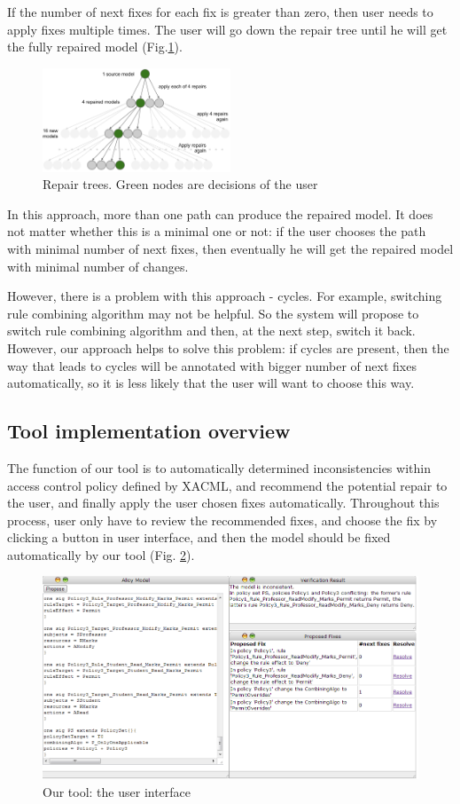 \documentclass{acm_proc_article-sp}
\begin{document}
If the number of next fixes for each fix is greater than zero, then user needs to apply fixes multiple times. The user will go down the repair tree until he will get the fully repaired model (Fig.\ref{fig:tree}).

\begin{figure}[h]
\includegraphics[width=0.5\textwidth]{tree.png}
\caption{Repair trees. Green nodes are decisions of the user}    
  \label{fig:tree}
\end{figure}

In this approach, more than one path can produce the repaired model. It does not matter whether this is a minimal one or not: if the user chooses the path with minimal number of next fixes, then eventually he will get the repaired model with minimal number of changes.

However, there is a problem with this approach - cycles. For example, switching rule combining algorithm may not be helpful. So the system will propose to switch rule combining algorithm and then, at the next step, switch it back. However, our approach helps to solve this problem: if cycles are present, then the way that leads to cycles will be annotated with bigger number of next fixes automatically, so it is less likely that the user will want to choose this way.

\subsection{Tool implementation overview}
The function of our tool is to automatically determined inconsistencies within access control policy defined by XACML, and recommend the potential repair to the user, and finally apply the user chosen fixes automatically. Throughout this process, user only have to review the recommended fixes, and choose the fix by clicking a button in user interface, and then the model should be fixed automatically by our tool (Fig. \ref{fig:tool}). 

\begin{figure}[ht]
\includegraphics[width=\textwidth]{tool.png}
\caption{Our tool: the user interface}    
  \label{fig:tool}
\end{figure}
\end{document}
